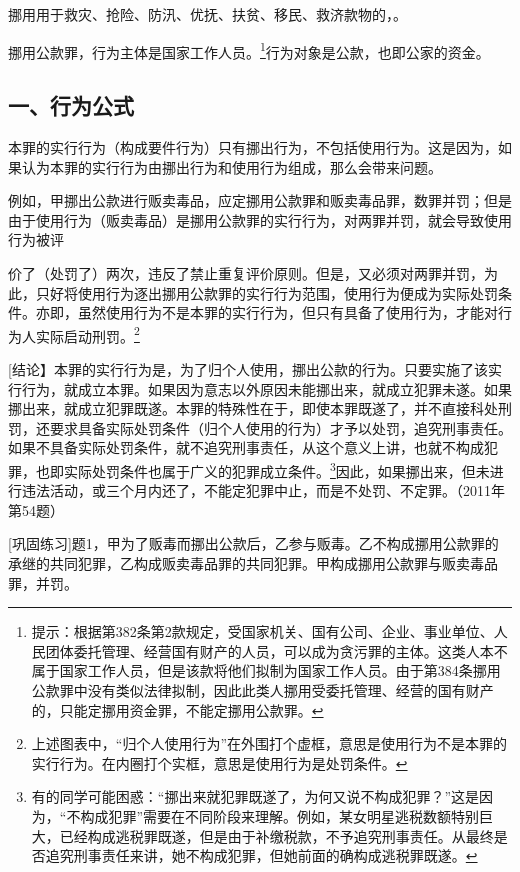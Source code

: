 挪用用于救灾、抢险、防汛、优抚、扶贫、移民、救济款物的，。

挪用公款罪，行为主体是国家工作人员。\footnote{提示：根据第382条第2款规定，受国家机关、国有公司、企业、事业单位、人民团体委托管理、经营国有财产的人员，可以成为贪污罪的主体。这类人本不属于国家工作人员，但是该款将他们拟制为国家工作人员。由于第384条挪用公款罪中没有类似法律拟制，因此此类人挪用受委托管理、经营的国有财产的，只能定挪用资金罪，不能定挪用公款罪。}行为对象是公款，也即公家的资金。

\subsection*{一、行为公式}


本罪的实行行为（构成要件行为）只有挪出行为，不包括使用行为。这是因为，如果认为本罪的实行行为由挪出行为和使用行为组成，那么会带来问题。

例如，甲挪出公款进行贩卖毒品，应定挪用公款罪和贩卖毒品罪，数罪并罚；但是由于使用行为（贩卖毒品）是挪用公款罪的实行行为，对两罪并罚，就会导致使用行为被评

价了（处罚了）两次，违反了禁止重复评价原则。但是，又必须对两罪并罚，为此，只好将使用行为逐出挪用公款罪的实行行为范围，使用行为便成为实际处罚条件。亦即，虽然使用行为不是本罪的实行行为，但只有具备了使用行为，才能对行为人实际启动刑罚。\footnote{上述图表中，“归个人使用行为”在外围打个虚框，意思是使用行为不是本罪的实行行为。在内圈打个实框，意思是使用行为是处罚条件。}

[结论】本罪的实行行为是，为了归个人使用，挪出公款的行为。只要实施了该实行行为，就成立本罪。如果因为意志以外原因未能挪出来，就成立犯罪未遂。如果挪出来，就成立犯罪既遂。本罪的特殊性在于，即使本罪既遂了，并不直接科处刑罚，还要求具备实际处罚条件（归个人使用的行为）才予以处罚，追究刑事责任。如果不具备实际处罚条件，就不追究刑事责任，从这个意义上讲，也就不构成犯罪，也即实际处罚条件也属于广义的犯罪成立条件。\footnote{有的同学可能困惑：“挪出来就犯罪既遂了，为何又说不构成犯罪？”这是因为，“不构成犯罪”需要在不同阶段来理解。例如，某女明星逃税数额特别巨大，已经构成逃税罪既遂，但是由于补缴税款，不予追究刑事责任。从最终是否追究刑事责任来讲，她不构成犯罪，但她前面的确构成逃税罪既遂。}因此，如果挪出来，但未进行违法活动，或三个月内还了，不能定犯罪中止，而是不处罚、不定罪。（2011年第54题）

[巩固练习]题1，甲为了贩毒而挪出公款后，乙参与贩毒。乙不构成挪用公款罪的承继的共同犯罪，乙构成贩卖毒品罪的共同犯罪。甲构成挪用公款罪与贩卖毒品罪，并罚。

